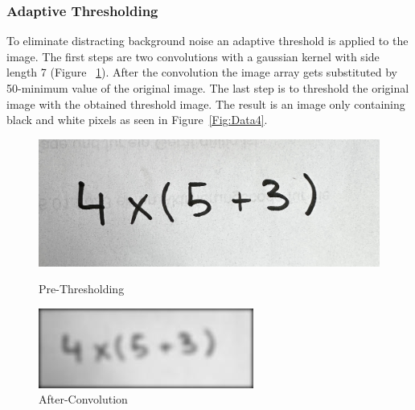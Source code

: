 \documentclass[@CLASSOPTIONS@]{tumarticle}
\begin{document}
\subsubsection{Adaptive Thresholding}

To eliminate distracting background noise an adaptive threshold is applied to the
image.
The first steps are two convolutions with a gaussian kernel with side length 7 (Figure ~\ref{Fig:Data4_1}).
After the convolution the image array gets substituted by 50-minimum value of the original image.
The last step is to threshold the original image with the obtained threshold image.
The result is an image only containing black and white pixels as seen in Figure~\ref{Fig:Data4}.

\begin{figure}[!htb]
   \begin{minipage}{0.48\textwidth}
     \centering
     \includegraphics[width=.7\linewidth]{figures/real_data_1}
     \caption{Pre-Thresholding}\label{Fig:Data3}
   \end{minipage}\hfill
   \vspace{0.3cm}
   \begin{minipage}{0.48\textwidth}
     \centering
     \includegraphics[width=.7\linewidth]{figures/convolve}
     \caption{After-Convolution}\label{Fig:Data4_1}
   \end{minipage}
      \vspace{0.3cm}


\end{figure}
\end{document}
